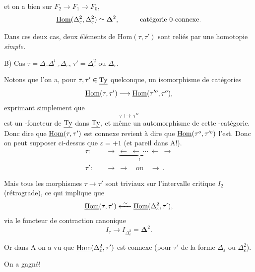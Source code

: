et on a bien sur $F_2\longrightarrow F_1\longrightarrow F_0$, %
\[
\underline{\mathrm{Hom}}(\Delta^2_\varepsilon,\Delta^2_\varepsilon)\simeq\boldsymbol{\Delta}^2,\qquad\quad\text{catégorie 0-connexe.}
\]

Dans ces deux cas, deux éléments de $\mathrm{Hom}(\tau,\tau')$ sont reliés par une homotopie \textit{simple.}


B) Cas $\tau=\Delta_\varepsilon\Delta^l_{-\varepsilon}\Delta_\varepsilon$, $\tau'=\Delta^2_\varepsilon$ ou $\Delta_\varepsilon$.

Notons que l'on a, pour $\tau,\tau'\in\underline{\mathrm{Ty}}$ quelconque, un isomorphisme de catégories
\[
\underline{\mathrm{Hom}}(\tau,\tau')\longrightarrow\underline{\mathrm{Hom}}(\tau'^o,\tau^o),
\]
exprimant simplement que
\[
\tau\longmapsto\tau^o
\]
est un -foncteur de $\underline{\mathrm{Ty}}$ dans $\underline{\mathrm{Ty}}$, et même un automorphisme de cette -catégorie. Donc dire que $\underline{\mathrm{Hom}}(\tau,\tau')$ est connexe revient à dire que $\underline{\mathrm{Hom}}(\tau^o,\tau'^o)$ l'est. Donc on peut supposer ci-dessus que $\varepsilon=+1$ (et pareil dans A!).
\[
\begin{aligned}
\tau :\quad & \longrightarrow\ \underbrace{\longleftarrow\ \longleftarrow\ \cdots\ \longleftarrow}_{l}\ \longrightarrow\\
\tau' :\quad & \longrightarrow\ \longrightarrow\quad\text{ou}\quad\longrightarrow\ .
\end{aligned}
\]

Mais tous les morphismes $\tau\longrightarrow\tau'$ sont triviaux sur l'intervalle critique $I_2$ (rétrograde), ce qui implique que
\[
\uHom(\tau,\tau')\xleftarrow{\ \sim\ }\uHom(\Delta^2_\varepsilon,\tau'),
\]
via le foncteur de contraction canonique
\[
I_\tau\longrightarrow I_{\Delta^2_\varepsilon}=\boldsymbol{\Delta}^2.
\]

Or dans A on a vu que $\underline{\mathrm{Hom}}(\Delta^2_\varepsilon,\tau')$ est connexe (pour $\tau'$ de la forme $\Delta_\varepsilon$ ou $\Delta^2_\varepsilon$).

On a gagné!

\newpage
{}


